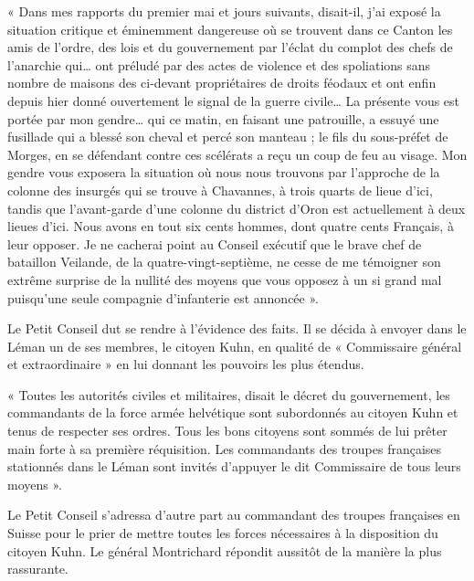 \documentclass[french,twoside]{book} %
\newenvironment{quoteblock}%
  {\begin{quoting}}
  {\end{quoting}}
\newenvironment{quotebar}{%
    \def\FrameCommand{{\color{rubric!10!}\vrule width 0.5em} \hspace{0.9em}}%
    \def\OuterFrameSep{\itemsep} %
    \MakeFramed {\advance\hsize-\width \FrameRestore}
  }%
  {%
    \endMakeFramed
  }
\renewenvironment{quoteblock}%
  {%
    \savenotes
    \setstretch{0.9}
    \begin{quotebar}
  }
  {%
    \end{quotebar}
    \spewnotes
  }
\begin{document}
\begin{quoteblock}
 \noindent « Dans mes rapports du premier mai et jours suivants, disait-il, j’ai exposé la situation critique et éminemment dangereuse où se trouvent dans ce Canton les amis de l’ordre, des lois et du gouvernement par l’éclat du complot des chefs de l’anarchie qui… ont préludé par des actes de violence et des spoliations sans nombre de maisons des ci-devant propriétaires de droits féodaux et ont enfin depuis hier donné ouvertement le signal de la guerre civile… La présente vous est portée par mon gendre… qui ce matin, en faisant une patrouille, a essuyé une fusillade qui a blessé son cheval et percé son manteau ; le fils du sous-préfet de Morges, en se défendant contre ces scélérats a reçu un coup de feu au visage. Mon gendre vous exposera la situation où nous nous trouvons par l’approche de la colonne des insurgés qui se trouve à Chavannes, à trois quarts de lieue d’ici, tandis que l’avant-garde d’une colonne du district d’Oron est actuellement à deux lieues d’ici. Nous avons en tout six cents hommes, dont quatre cents Français, à leur opposer. Je ne cacherai point au Conseil exécutif que le brave chef de bataillon Veilande, de la quatre-vingt-septième, ne cesse de me témoigner son extrême surprise de la nullité des moyens que vous opposez à un si grand mal puisqu’une seule compagnie d’infanterie est annoncée ».
 \end{quoteblock}

\noindent Le Petit Conseil dut se rendre à l’évidence des faits. Il se décida à envoyer dans le Léman un de ses membres, le citoyen Kuhn, en qualité de « Commissaire général et extraordinaire » en lui donnant les pouvoirs les plus étendus.\par

\begin{quoteblock}
 \noindent « Toutes les autorités civiles et militaires, disait le décret du gouvernement, les commandants de la force armée helvétique sont subordonnés au citoyen Kuhn et tenus de respecter ses ordres. Tous les bons citoyens sont sommés de lui prêter main forte à sa première réquisition. Les commandants des troupes françaises stationnés dans le Léman sont invités d’appuyer le dit Commissaire de tous leurs moyens ».
 \end{quoteblock}

\noindent Le Petit Conseil s’adressa d’autre part au commandant des troupes françaises en Suisse pour le prier de mettre toutes les forces nécessaires à la disposition du citoyen Kuhn. Le général Montrichard répondit aussitôt de la manière la plus rassurante. \par
\end{document}
